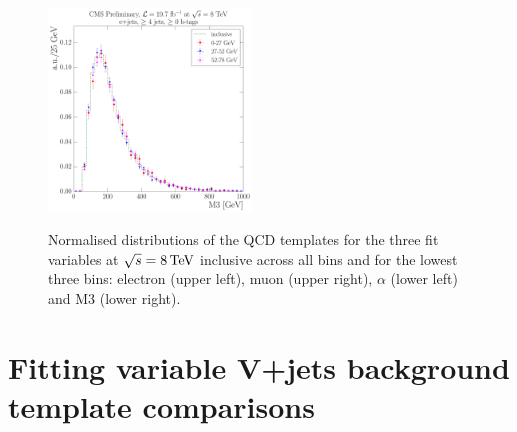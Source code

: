 \begin{figure}[hbtp]
     \includegraphics[width=0.48\textwidth]{Chapters/04_Analysis/04b_XSections/images/8TeV/fit_variables/WPT/M3/qcd/WPT_M3_0orMoreBtag_QCD_template_comparison.pdf}\\
	 \caption{Normalised distributions of the QCD templates for the three fit variables at $\sqrt{s}=8\,\text{Te\hspace{-.08em}V}$
	 inclusive across all \wpt bins and for the lowest three \wpt bins: electron \abseta (upper
	 left), muon \abseta (upper right), $\alpha$ (lower left) and M3 (lower right).}
     \label{fig:WPT_fit_variable_qcd_comparisons_8TeV}
\end{figure}

\clearpage
\section{Fitting variable V+jets background template comparisons}
\label{as:fitting_variable_vjets_template_comparisons}

